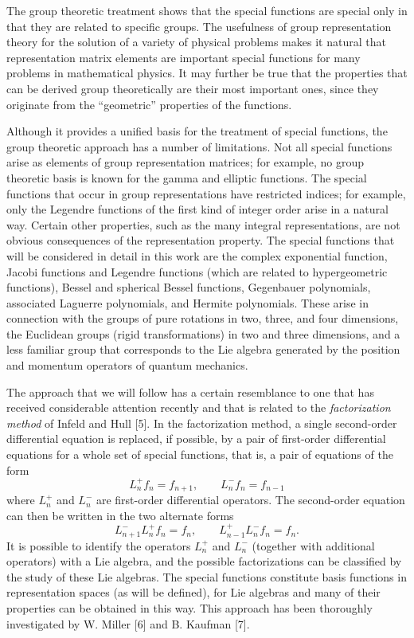 The group theoretic treatment shows that the special functions are special only in that they are related to specific groups. The usefulness of group representation theory for the solution of a variety of physical problems makes it natural that representation matrix elements are important special functions for many problems in mathematical physics. It may further be true that the properties that can be derived group theoretically are their most important ones, since they originate from the ``geometric'' properties of the functions.

Although it provides a unified basis for the treatment of special functions, the group theoretic approach has a number of limitations. Not all special functions arise as elements of group representation matrices; for example, no group theoretic basis is known for the gamma and elliptic functions.	The special functions that occur in group representations have restricted indices; for example, only the Legendre functions of the first kind of integer order arise in a natural way. Certain other properties, such as the many integral representations, are not obvious consequences of the representation property.
The special functions that will be considered in detail in this work are the complex exponential function, Jacobi functions and Legendre functions (which are related to hypergeometric functions), Bessel and spherical Bessel functions, Gegenbauer polynomials, associated Laguerre polynomials, and Hermite polynomials. These arise in connection with the groups of pure rotations in two, three, and four dimensions, the Euclidean groups (rigid transformations) in two and three dimensions, and a less familiar group that corresponds to the Lie algebra generated by the position and momentum operators of quantum mechanics.

The approach that we will follow has a certain resemblance to one that has received considerable attention recently and that is related to the \emph{factorization method} of Infeld and Hull [5]. In the factorization method, a single second-order differential equation is replaced, if possible, by a pair of first-order differential equations for a whole set of special functions, that is, a pair of equations of the form
\begin{equation}
  L_{n}^{+} f_{n} = f_{n+1}, \qquad L_{n}^{-} f_{n} = f_{n-1}
  \label{eq:102}
\end{equation}
where $L_{n}^{+}$ and $L_{n}^{-}$ are first-order differential operators. The
second-order equation can then be written in the two alternate forms
\begin{equation}
  L_{n+1}^{-} L_{n}^{+} f_{n} = f_{n}, \qquad L_{n-1}^{+} L_{n}^{-} f_{n} = f_{n} .
  \label{eq:102}
\end{equation}
It is possible to identify the operators $L_{n}^{+}$ and $L_{n}^{-}$ (together with additional operators) with a Lie algebra, and the possible factorizations can be classified by the study of these Lie algebras. The special functions constitute basis functions in representation spaces (as will be defined), for Lie algebras and many of their properties can be obtained in this way. This approach has been thoroughly investigated by W. Miller [6] and B. Kaufman [7].

